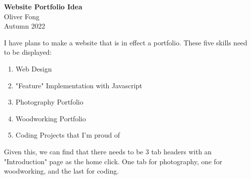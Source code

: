 \documentclass[12pt]{article}
\theoremstyle{definition}
\begin{document}
\begin{center}
{\LARGE \bf Website Portfolio Idea}\\
{\large Oliver Fong}\\
Autumn 2022
\end{center}
I have plans to make a website that is in effect a portfolio.
These five skills need to be displayed:
\begin{enumerate}
    \item Web Design
    \item "Feature" Implementation with Javascript
    \item Photography Portfolio
    \item Woodworking Portfolio
    \item Coding Projects that I'm proud of
\end{enumerate}

Given this, we can find that there needs to be 3 tab headers with an "Introduction" page as the home click. One tab for photography, one for woodworking, and the last for coding. 
\end{document}
